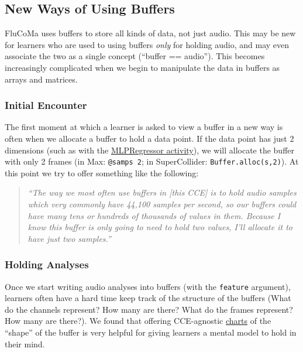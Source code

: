 \documentclass{article}
\begin{document}
\subsection{New Ways of Using Buffers}\label{new-ways-of-using-buffers}

FluCoMa uses buffers to store all kinds of data, not just audio. This
may be new for learners who are used to using buffers \emph{only} for
holding audio, and may even associate the two as a single concept
(``buffer == audio''). This becomes increasingly complicated when we
begin to manipulate the data in buffers as arrays and matrices.

\subsubsection{Initial Encounter}

The first moment at which a learner is asked to view a buffer in a new
way is often when we allocate a buffer to hold a data point. If the data
point has just 2 dimensions (such as with the
\hyperref[example-lesson-plan]{MLPRegressor activity}), we will allocate the
buffer with only 2 frames (in Max: \texttt{@samps\ 2}; in SuperCollider:
\texttt{Buffer.alloc(s,2)}). At this point we try to offer something
like the following:

\begin{quote}
\emph{``The way we most often use buffers in {[}this CCE{]} is to hold
audio samples which very commonly have 44,100 samples per second, so our
buffers could have many tens or hundreds of thousands of values in them.
Because I know this buffer is only going to need to hold two values,
I'll allocate it to have just two samples.''}
\end{quote}

\subsubsection{Holding Analyses}

Once we start writing audio analyses into buffers (with the
\texttt{feature} argument), learners often have a hard time keep track
of the structure of the buffers (What do the channels represent? How
many are there? What do the frames represent? How many are there?). We
found that offering CCE-agnostic
\href{https://f003.backblazeb2.com/file/learnassets/examples/teaching-material/buffer-charts.pdf}{charts}
of the ``shape'' of the buffer is very helpful for giving learners a
mental model to hold in their mind.
\end{document}
